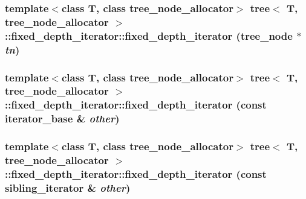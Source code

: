 \hypertarget{classtree_1_1fixed__depth__iterator_a9c0c41473a4d70efa17d7906829823c}{
\subsubsection{\setlength{\rightskip}{0pt plus 5cm}template$<$class T, class tree\_\-node\_\-allocator$>$ {\bf tree}$<$ T, tree\_\-node\_\-allocator $>$::fixed\_\-depth\_\-iterator::fixed\_\-depth\_\-iterator ({\bf tree\_\-node} $\ast$ {\em tn})}}
\label{classtree_1_1fixed__depth__iterator_a9c0c41473a4d70efa17d7906829823c}


\hypertarget{classtree_1_1fixed__depth__iterator_64403be9e04a8e4929531b8e227b5d94}{
\subsubsection{\setlength{\rightskip}{0pt plus 5cm}template$<$class T, class tree\_\-node\_\-allocator$>$ {\bf tree}$<$ T, tree\_\-node\_\-allocator $>$::fixed\_\-depth\_\-iterator::fixed\_\-depth\_\-iterator (const {\bf iterator\_\-base} \& {\em other})}}
\label{classtree_1_1fixed__depth__iterator_64403be9e04a8e4929531b8e227b5d94}


\hypertarget{classtree_1_1fixed__depth__iterator_949317e3e8a986e72e0a8dbb79a00b03}{
\subsubsection{\setlength{\rightskip}{0pt plus 5cm}template$<$class T, class tree\_\-node\_\-allocator$>$ {\bf tree}$<$ T, tree\_\-node\_\-allocator $>$::fixed\_\-depth\_\-iterator::fixed\_\-depth\_\-iterator (const {\bf sibling\_\-iterator} \& {\em other})}}
\label{classtree_1_1fixed__depth__iterator_949317e3e8a986e72e0a8dbb79a00b03}


